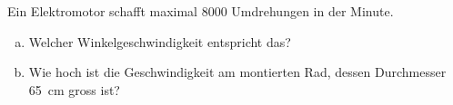 
\begin{aufgabe}
\label{elektromotor}
	Ein Elektromotor schafft maximal 8000 Umdrehungen in der Minute.
	\begin{enumerate} [a)]
		\item Welcher Winkelgeschwindigkeit entspricht das?
		\item Wie hoch ist die Geschwindigkeit am montierten Rad, dessen Durchmesser \SI{65}{cm} gross ist?
	\end{enumerate}
\end{aufgabe}

